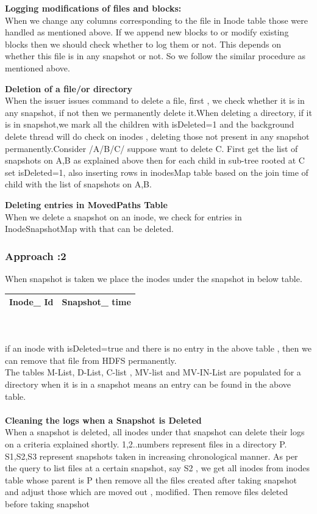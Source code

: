 \textbf{Logging modifications of files and blocks:}\\
When we change any columns corresponding to the file in Inode table those were handled as mentioned above. If we append new blocks to or modify existing blocks then we should check whether to log them or not. This depends on whether this file is in any snapshot or not. So we follow the similar procedure as mentioned above.


\textbf{Deletion of a file/or directory}\\
When the issuer issues command to delete a file, first , we check whether it is in any snapshot, if not then we permanently delete it.When deleting a directory, if it is in snapshot,we mark all the children with isDeleted=1 and the background delete thread will do check on inodes , deleting those not present in any snapshot permanently.Consider /A/B/C/ suppose want to delete C. First get the list of snapshots on A,B as explained above then for each child in sub-tree rooted at C set isDeleted=1, also inserting rows in inodesMap table based on the join time of child with the list of snapshots on A,B. 

\textbf{Deleting entries in MovedPaths Table}\\
When we delete a snapshot on an inode, we check for entries in InodeSnapshotMap with that can be deleted.

\subsubsection{Approach :2}
When snapshot is taken we place the inodes under the snapshot in below table.

\begin{tabular}{|c|c|}
\hline
Inode\_ Id&Snapshot\_ time\\
\hline
\end{tabular}\\\\
if an inode with isDeleted=true and there is no entry in the above table , then we can remove that file from HDFS permanently.\\
The tables M-List, D-List, C-list , MV-list and MV-IN-List are populated for a directory when it is in a snapshot means an entry can be found in the above table.\\\\
\textbf{Cleaning the logs when a Snapshot is Deleted}\\
When a snapshot is deleted, all inodes under that snapshot can delete their logs on a criteria explained shortly. 1,2..numbers represent files in a directory P. S1,S2,S3 represent snapshots taken in increasing chronological manner. As per the query to list files at a certain snapshot, say S2 , we get all inodes from inodes table whose parent is P then remove all the files created after taking snapshot and adjust those which are moved out , modified. Then remove files deleted before taking snapshot 


